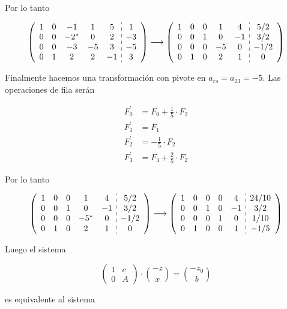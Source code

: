 \documentclass[10pt]{article}
\begin{document}
Por lo tanto

$$
\left(\begin{array}{ccccc:c}
1 & 0 & -1 & 1 & 5 & 1 \\
0 & 0 & -2^{*} & 0 & 2 & -3 \\
0 & 0 & -3 & -5 & 3 & -5 \\
0 & 1 & 2 & 2 & -1 & 3
\end{array}\right) \longrightarrow\left(\begin{array}{ccccc:c}
1 & 0 & 0 & 1 & 4 & 5 / 2 \\
0 & 0 & 1 & 0 & -1 & 3 / 2 \\
0 & 0 & 0 & -5 & 0 & -1 / 2 \\
0 & 1 & 0 & 2 & 1 & 0
\end{array}\right)
$$

Finalmente hacemos una transformación con pivote en $a_{r s}=a_{23}=-5$. Las operaciones de fila serán

$$
\begin{aligned}
F_{0}^{\prime} & =F_{0}+\frac{1}{5} \cdot F_{2} \\
F_{1}^{\prime} & =F_{1} \\
F_{2}^{\prime} & =-\frac{1}{5} \cdot F_{2} \\
F_{3}^{\prime} & =F_{3}+\frac{2}{5} \cdot F_{2}
\end{aligned}
$$

Por lo tanto

$$
\left(\begin{array}{ccccc:c}
1 & 0 & 0 & 1 & 4 & 5 / 2 \\
0 & 0 & 1 & 0 & -1 & 3 / 2 \\
0 & 0 & 0 & -5^{*} & 0 & -1 / 2 \\
0 & 1 & 0 & 2 & 1 & 0
\end{array}\right) \longrightarrow\left(\begin{array}{ccccc:c}
1 & 0 & 0 & 0 & 4 & 24 / 10 \\
0 & 0 & 1 & 0 & -1 & 3 / 2 \\
0 & 0 & 0 & 1 & 0 & 1 / 10 \\
0 & 1 & 0 & 0 & 1 & -1 / 5
\end{array}\right)
$$

Luego el sistema

$$
\left(\begin{array}{cc}
1 & c \\
0 & A
\end{array}\right) \cdot\binom{-z}{x}=\binom{-z_{0}}{b}
$$

es equivalente al sistema
\end{document}
